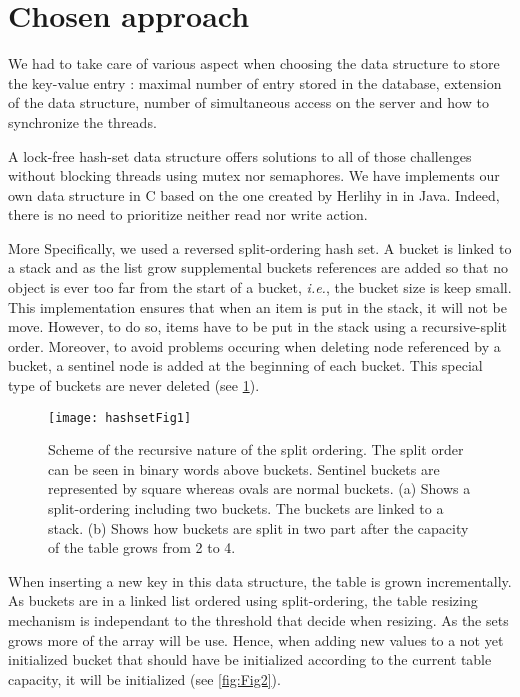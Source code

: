 \documentclass[a4paper,11pt]{report}
\begin{document}
    \section*{Chosen approach}

    We had to take care of various aspect when choosing the data structure to
    store the key-value entry : maximal number of entry stored in the database,
    extension of the data structure, number of simultaneous access on the server and
    how to synchronize the threads.

    A lock-free hash-set data structure offers solutions to all of those challenges without blocking threads using mutex
    nor semaphores. We have implements our own data structure in C based on the one created by Herlihy in
    \cite{Herlihy2006} in Java. Indeed, there is no need to prioritize neither read nor write action.

    More Specifically, we used a reversed split-ordering hash set.
    A bucket is linked to a stack and as the list grow supplemental buckets references are added so that
    no object is ever too far from the start of a bucket, \textit{i.e.}, the bucket size is keep small.
    This implementation ensures that when an item is put in the stack, it will not be move.
    However, to do so, items have to be put in the stack using a recursive-split order.
    Moreover, to avoid problems occuring when deleting node referenced by a bucket, a sentinel node is added
    at the beginning of each bucket. This special type of buckets are never deleted (see \ref{fig:Fig1}).

    \begin{figure}[h]
        \centering
            \texttt{[image: hashsetFig1]}
        \caption{Scheme of the recursive nature of the split ordering.
        The split order can be seen in binary words above buckets.
        Sentinel buckets are represented by square whereas ovals are normal buckets.
        (a) Shows a split-ordering including two buckets. The buckets are linked to a stack.
        (b) Shows how buckets are split in two part after the capacity of the table grows from 2 to 4.}
        \label{fig:Fig1}
    \end{figure}

    When inserting a new key in this data structure, the table is grown incrementally.
    As buckets are in a linked list ordered using split-ordering, the table resizing mechanism is independant to
    the threshold that decide when resizing. As the sets grows more of the array will be use. Hence, when adding
    new values to a not yet initialized bucket that should have be initialized according to the current table capacity,
    it will be initialized (see \ref{fig:Fig2}).
\end{document}
